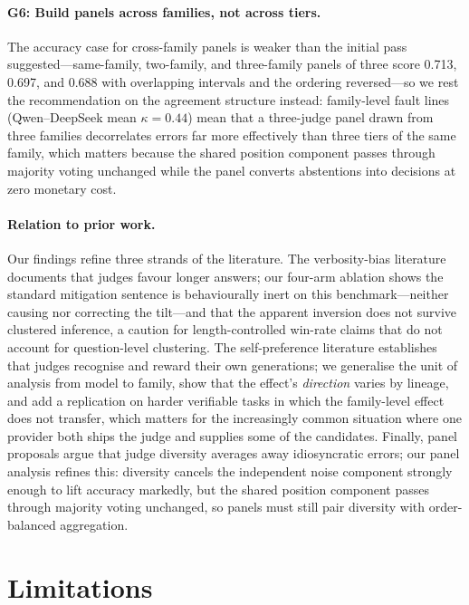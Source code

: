 \documentclass[review,12pt]{elsarticle}
\begin{document}
\paragraph{G6: Build panels across families, not across tiers.}
The accuracy case for cross-family panels is weaker than the initial pass
suggested---same-family, two-family, and three-family panels of three
score 0.713, 0.697, and 0.688 with overlapping intervals and the ordering
reversed---so we rest the recommendation on the agreement structure
instead: family-level fault lines (Qwen--DeepSeek mean $\kappa=0.44$)
mean that a three-judge panel drawn from three families decorrelates
errors far more effectively than three tiers of the same family, which
matters because the shared position component passes through majority
voting unchanged while the panel converts abstentions into decisions at
zero monetary cost.

\paragraph{Relation to prior work.}
Our findings refine three strands of the literature. The verbosity-bias
literature documents that judges favour longer answers; our four-arm
ablation shows the standard mitigation sentence is behaviourally inert on
this benchmark---neither causing nor correcting the tilt---and that the
apparent inversion does not survive clustered inference, a caution for
length-controlled win-rate claims that do not account for question-level
clustering. The self-preference literature establishes that judges recognise
and reward their own generations; we generalise the unit of analysis from model to family, show that the
effect's \emph{direction} varies by lineage, and add a replication on
harder verifiable tasks in which the family-level effect does not
transfer, which matters for the increasingly common situation where one
provider both ships the judge and supplies some of the candidates. Finally,
panel proposals argue that judge diversity averages away idiosyncratic
errors; our panel analysis refines this: diversity cancels the independent
noise component strongly enough to lift accuracy markedly, but the shared
position component passes through majority voting unchanged, so panels must
still pair diversity with order-balanced aggregation.

\section{Limitations}
\label{sec:limitations}
\end{document}
